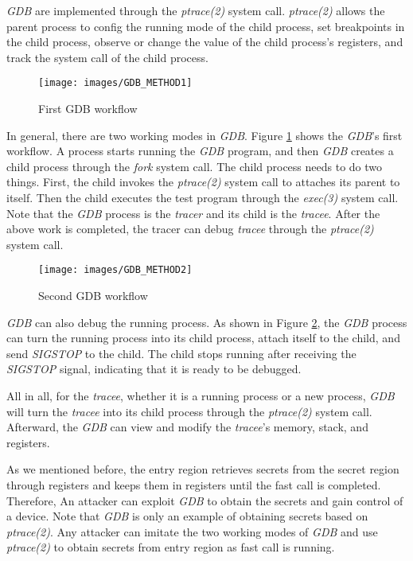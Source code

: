 \emph{GDB}\cite{16} are implemented through the \emph{ptrace(2)} system call. 
\emph{ptrace(2)}\cite{17} allows the parent process to config the running mode of 
the child process, set breakpoints in the child process, observe or 
change the value of the child process's registers, and track the system 
call of the child process.

\begin{figure}[tbp]
  \centering
  \texttt{[image: images/GDB\_METHOD1]}
  \caption[First GDB workflow]{First GDB workflow}
  \label{fig:GDB_METHOD1}
\end{figure}

In general, there are two working modes in \emph{GDB}. Figure \ref{fig:GDB_METHOD1} shows 
the \emph{GDB}'s first workflow. A process starts running the \emph{GDB} program, 
and then \emph{GDB} creates a child process through the \emph{fork} system call. 
The child process needs to do two things. First, the child 
invokes the \emph{ptrace(2)} system call to attaches its parent to itself. 
Then the child executes the test program through the \emph{exec(3)} 
system call. Note that the \emph{GDB} process is the \emph{tracer} and its child 
is the \emph{tracee}. After the above work is completed, the tracer can debug \emph{tracee} 
through the \emph{ptrace(2)} system call.



\begin{figure}[tbp]
  \centering
  \texttt{[image: images/GDB\_METHOD2]}
  \caption[Second GDB workflow]{Second GDB workflow}
  \label{fig:GDB_METHOD2}
\end{figure}

\emph{GDB} can also debug the running process. As shown in Figure \ref{fig:GDB_METHOD2}, 
the \emph{GDB} process can turn the running process into its child process, 
attach itself to the child, and send \emph{SIGSTOP} to the child. 
The child stops running after receiving the \emph{SIGSTOP} signal, 
indicating that it is ready to be debugged.

All in all, for the \emph{tracee}, whether it is a running process or 
a new process, \emph{GDB} will turn the \emph{tracee} into its child process 
through the \emph{ptrace(2)} system call. Afterward, the \emph{GDB} can view and modify 
the \emph{tracee}'s memory, stack, and registers.

As we mentioned before, the entry region retrieves secrets 
from the secret region through registers and keeps them in registers until the fast call is completed. 
Therefore, An attacker can exploit \emph{GDB}  to obtain the secrets 
and gain control of a device.  Note that \emph{GDB} is only an example of obtaining 
secrets based on \emph{ptrace(2)}. Any attacker can imitate the two working modes of 
\emph{GDB} and use \emph{ptrace(2)} to obtain secrets from entry region as fast call is running.

